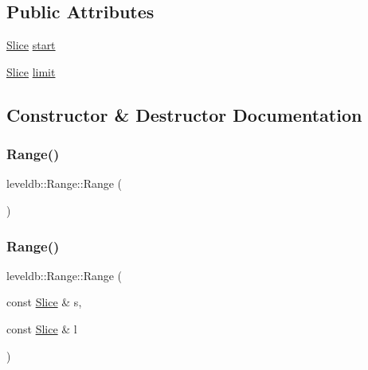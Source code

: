 \subsection*{Public Attributes}
\begin{DoxyCompactItemize}
\item 
\mbox{\hyperlink{classleveldb_1_1_slice}{Slice}} \mbox{\hyperlink{structleveldb_1_1_range_ad80a55e20eb7d864d497e8f94953c00d}{start}}
\item 
\mbox{\hyperlink{classleveldb_1_1_slice}{Slice}} \mbox{\hyperlink{structleveldb_1_1_range_a9c45c46ac20a1c86c265f1f9c35d6632}{limit}}
\end{DoxyCompactItemize}


\subsection{Constructor \& Destructor Documentation}
\mbox{\label{structleveldb_1_1_range_af73eb85edfde053ebc456cb08f4d3ec1}} 
\subsubsection{\texorpdfstring{Range()}{Range()}\hspace{0.1cm}{\footnotesize\ttfamily [1/2]}}
{\footnotesize\ttfamily leveldb\+::\+Range\+::\+Range (\begin{DoxyParamCaption}{ }\end{DoxyParamCaption})\hspace{0.3cm}{\ttfamily [inline]}}

\mbox{\label{structleveldb_1_1_range_a797d5e3b58cc615dfb805965d06bdcbf}} 
\subsubsection{\texorpdfstring{Range()}{Range()}\hspace{0.1cm}{\footnotesize\ttfamily [2/2]}}
{\footnotesize\ttfamily leveldb\+::\+Range\+::\+Range (\begin{DoxyParamCaption}\item[{const \mbox{\hyperlink{classleveldb_1_1_slice}{Slice}} \&}]{s,  }\item[{const \mbox{\hyperlink{classleveldb_1_1_slice}{Slice}} \&}]{l }\end{DoxyParamCaption})\hspace{0.3cm}{\ttfamily [inline]}}



